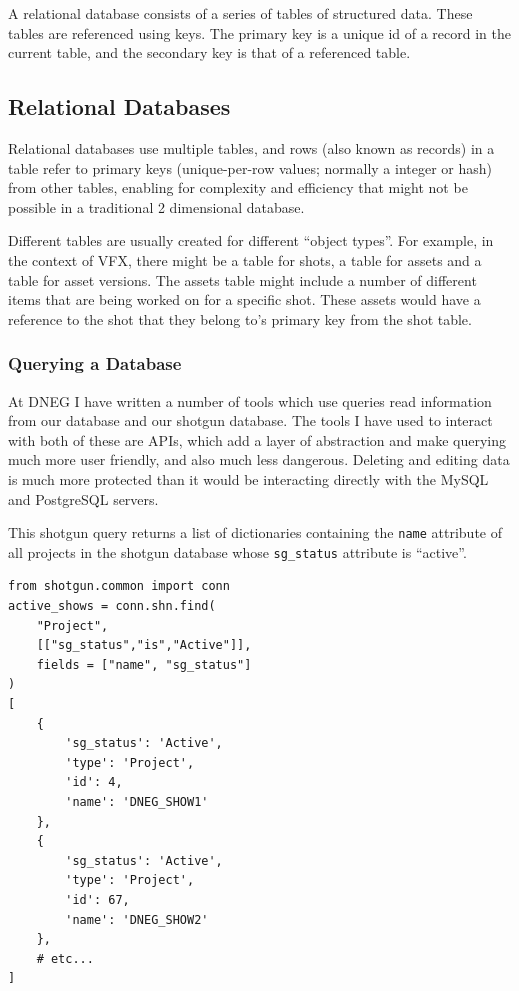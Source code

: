 A relational database consists of a series of tables of structured data. These tables are referenced using keys. The primary key is a unique id of a record in the current table, and the secondary key is that of a referenced table.

\hypertarget{relational-databases}{%
\subsection{Relational Databases}\label{relational-databases}}

Relational databases use multiple tables, and rows (also known as records) in a table refer to primary keys (unique-per-row values; normally a integer or hash) from other tables, enabling for complexity and efficiency that might not be possible in a traditional 2 dimensional database.

Different tables are usually created for different ``object types''. For example, in the context of VFX, there might be a table for shots, a table for assets and a table for asset versions. The assets table might include a number of different items that are being worked on for a specific shot. These assets would have a reference to the shot that they belong to's primary key from the shot table.

\hypertarget{querying-a-database}{%
\subsubsection{Querying a Database}\label{querying-a-database}}

At DNEG I have written a number of tools which use queries read information from our database and our shotgun database. The tools I have used to interact with both of these are APIs, which add a layer of abstraction and make querying much more user friendly, and also much less dangerous. Deleting and editing data is much more protected than it would be interacting directly with the MySQL and PostgreSQL servers.

This shotgun query returns a list of dictionaries containing the \texttt{name} attribute of all projects in the shotgun database whose \texttt{sg\_status} attribute is ``active''.

\begin{verbatim}
from shotgun.common import conn
active_shows = conn.shn.find(
    "Project",
    [["sg_status","is","Active"]],
    fields = ["name", "sg_status"]
)
[
    {
        'sg_status': 'Active',
        'type': 'Project',
        'id': 4,
        'name': 'DNEG_SHOW1'
    },
    {
        'sg_status': 'Active',
        'type': 'Project',
        'id': 67,
        'name': 'DNEG_SHOW2'
    },
    # etc...
]
\end{verbatim}

